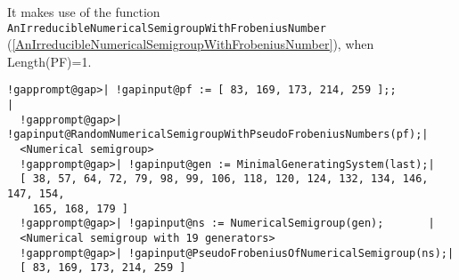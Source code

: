 \documentclass[a4paper,11pt]{report}
\begin{document}
{{{ It makes use of the function \texttt{AnIrreducibleNumericalSemigroupWithFrobeniusNumber} (\ref{AnIrreducibleNumericalSemigroupWithFrobeniusNumber}), when Length(PF)=1. 

 
\begin{Verbatim}[commandchars=!@|,fontsize=\small,frame=single,label=Example]
  !gapprompt@gap>| !gapinput@pf := [ 83, 169, 173, 214, 259 ];;                     |
  !gapprompt@gap>| !gapinput@RandomNumericalSemigroupWithPseudoFrobeniusNumbers(pf);|
  <Numerical semigroup>
  !gapprompt@gap>| !gapinput@gen := MinimalGeneratingSystem(last);|
  [ 38, 57, 64, 72, 79, 98, 99, 106, 118, 120, 124, 132, 134, 146, 147, 154, 
    165, 168, 179 ]
  !gapprompt@gap>| !gapinput@ns := NumericalSemigroup(gen);       |
  <Numerical semigroup with 19 generators>
  !gapprompt@gap>| !gapinput@PseudoFrobeniusOfNumericalSemigroup(ns);|
  [ 83, 169, 173, 214, 259 ]
\end{Verbatim}
 }

 }

 }

 
\end{document}
